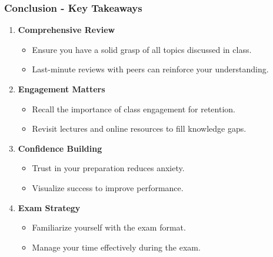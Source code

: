 \documentclass[aspectratio=169]{beamer}
\begin{document}
\begin{frame}[fragile]
    \frametitle{Conclusion - Key Takeaways}
    \begin{enumerate}
        \item \textbf{Comprehensive Review}
        \begin{itemize}
            \item Ensure you have a solid grasp of all topics discussed in class.
            \item Last-minute reviews with peers can reinforce your understanding.
        \end{itemize}
        
        \item \textbf{Engagement Matters}
        \begin{itemize}
            \item Recall the importance of class engagement for retention.
            \item Revisit lectures and online resources to fill knowledge gaps.
        \end{itemize}
        
        \item \textbf{Confidence Building}
        \begin{itemize}
            \item Trust in your preparation reduces anxiety.
            \item Visualize success to improve performance.
        \end{itemize}
        
        \item \textbf{Exam Strategy}
        \begin{itemize}
            \item Familiarize yourself with the exam format.
            \item Manage your time effectively during the exam.
        \end{itemize}
    \end{enumerate}
\end{frame}
\end{document}
